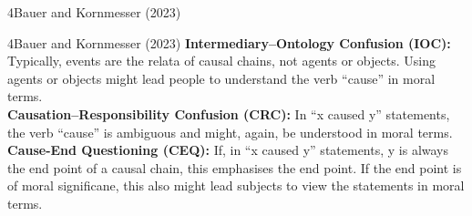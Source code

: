 \documentclass[xcolor=table,9pt,aspectratio=169]{beamer}
\begin{document}
\begin{frame}
\begin{overlayarea}{\textwidth}{0.81\paperheight}{
   \vspace*{11mm}
   \textcolor{uolblue}
   {4\hspace*{1em}Bauer and Kornmesser (2023)}
}
\end{overlayarea}
\end{frame}


\begin{frame}{\vspace*{10mm}4\hspace*{1em}Bauer and Kornmesser (2023)}
\vspace*{-5mm}
\textbf{Intermediary--Ontology Confusion (IOC):} Typically, events are the relata of causal chains, not agents or objects. Using agents or objects might lead people to understand the verb ``cause'' in moral terms.\\
\vspace*{1em}
\textbf{Causation--Responsibility Confusion (CRC):} In ``x caused y'' statements, the verb ``cause'' is ambiguous and might, again, be understood in moral terms.\\
\vspace*{1em}
\textbf{Cause-End Questioning (CEQ):} If, in ``x caused y'' statements, y is always the end point of a causal chain, this emphasises the end point. If the end point is of moral significane, this also might lead subjects to view the statements in moral terms.\\
\end{frame}
\end{document}
